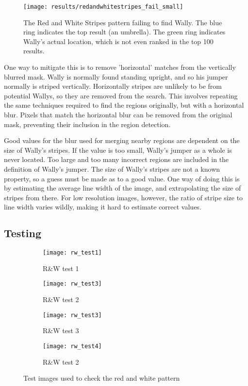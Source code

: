 \documentclass[../main.tex]{subfiles}
\begin{document}
    \begin{figure}[H]
      \centering
      \texttt{[image: results/redandwhitestripes\_fail\_small]}
      \caption[
          Fail case for the `Red and White' pattern
        ]{
        The Red and White Stripes pattern failing to find Wally.
        The blue ring indicates the top result (an umbrella).
        The green ring indicates Wally's actual location, which is not even ranked in the top 100 results.
      }
      \label{rws_fail_small}
    \end{figure}

    One way to mitigate this is to remove 'horizontal' matches from the vertically blurred mask.
    Wally is normally found standing upright, and so his jumper normally is striped vertically.
    Horizontally stripes are unlikely to be from potential Wallys, so they are removed from the search.
    This involves repeating the same techniques required to find the regions originally, but with a horizontal blur.
    Pixels that match the horizontal blur can be removed from the original mask, preventing their inclusion in the region detection.

    Good values for the blur used for merging nearby regions are dependent on the size of Wally's stripes.
    If the value is too small, Wally's jumper as a whole is never located.
    Too large and too many incorrect regions are included in the definition of Wally's jumper.
    The size of Wally's stripes are not a known property, so a guess must be made as to a good value.
    One way of doing this is by estimating the average line width of the image, and extrapolating the size of stripes from there.
    For low resolution images, however, the ratio of stripe size to line width varies wildly, making it hard to estimate correct values.
    
  \subsection{Testing}
    \begin{figure}[H]
      \centering
      \begin{subfigure}[B]{0.4\textwidth}
        \centering
        \texttt{[image: rw\_test1]} 
        \caption{R\&W test 1}
      \end{subfigure}
      \begin{subfigure}[B]{0.4\textwidth}
        \centering
        \texttt{[image: rw\_test3]} 
        \caption{R\&W test 2}
      \end{subfigure}
      \begin{subfigure}[B]{0.4\textwidth}
        \centering
        \texttt{[image: rw\_test3]} 
        \caption{R\&W test 3}
      \end{subfigure}
      \begin{subfigure}[B]{0.4\textwidth}
        \centering
        \texttt{[image: rw\_test4]} 
        \caption{R\&W test 2}
      \end{subfigure}
      \caption{Test images used to check the red and white pattern}
    \end{figure}
\end{document}
